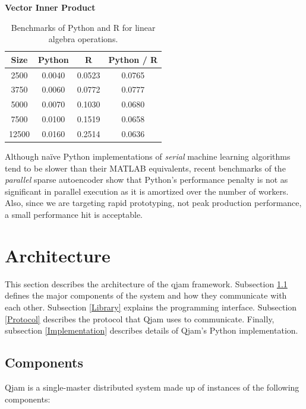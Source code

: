 \documentclass[%
  final,
  notitlepage,
  narroweqnarray,
  inline,
]{ieee}
\begin{document}
\begin{table}[h!]
\begin{center}
    \vspace{1em}
    \textbf{Vector Inner Product} \\
    \begin{tabular}{cccc}
      Size  & Python &  R       & Python / R \\
      \hline
      2500  & 0.0040 & 0.0523 & 0.0765 \\
      3750  & 0.0060 & 0.0772 & 0.0777 \\
      5000  & 0.0070 & 0.1030 & 0.0680 \\
      7500  & 0.0100 & 0.1519 & 0.0658 \\
      12500 & 0.0160 & 0.2514 & 0.0636 \\
    \end{tabular}
  \end{center}
  \caption{Benchmarks of Python and R for linear algebra
    operations.}
  \label{PythonvsR}
\end{table}

Although na\"{i}ve Python implementations of {\it serial} machine learning
algorithms tend to be slower than their MATLAB equivalents, recent benchmarks
of the {\it parallel} sparse autoencoder show that Python's performance penalty
is not as significant in parallel execution as it is amortized over the number
of workers. Also, since we are targeting rapid prototyping, not peak production
performance, a small performance hit is acceptable.

\section{Architecture}

This section describes the architecture of the qjam framework. Subsection
\ref{Components} defines the major components of the system and how they
communicate with each other. Subsection \ref{Library} explains the programming
interface. Subsection \ref{Protocol} describes the protocol that Qjam uses to
communicate. Finally, subsection \ref{Implementation} describes details of
Qjam's Python implementation.

\subsection{Components}
\label{Components}

Qjam is a single-master distributed system made up of instances of the
following components: \\
\end{document}

